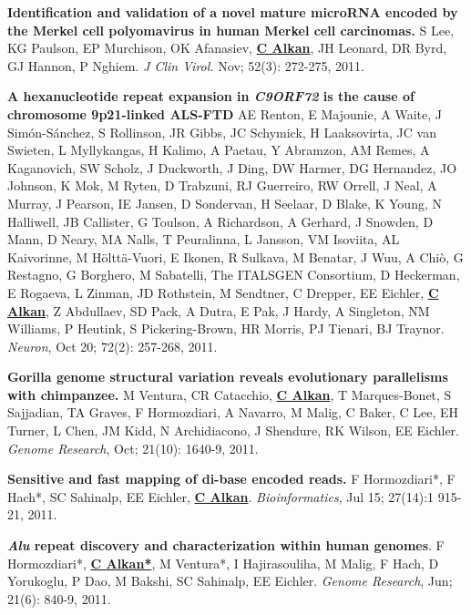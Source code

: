 \vspace{-.2cm}
{\bf Identification and validation of a novel mature microRNA encoded by the Merkel cell polyomavirus in human Merkel cell carcinomas.}
S Lee, KG Paulson, EP Murchison, OK Afanasiev, {\bf {\underline {C Alkan}}}, JH Leonard, DR Byrd, GJ Hannon, 
P Nghiem. {\em J Clin Virol.} Nov; 52(3): 272-275, 2011. 

\clearpage

\vspace{-.2cm}
{\bf A hexanucleotide repeat expansion in \textit{C9ORF72} is the cause of chromosome 9p21-linked ALS-FTD}  
AE Renton, E Majounie, A Waite, J Simón-Sánchez, S Rollinson, JR Gibbs, JC Schymick, H Laaksovirta, JC van Swieten, L Myllykangas, 
H Kalimo, A Paetau, Y Abramzon, AM Remes, A Kaganovich, SW Scholz, J Duckworth, J Ding, DW Harmer, DG Hernandez, JO Johnson, 
K Mok, M Ryten, D Trabzuni, RJ Guerreiro, RW Orrell, J Neal, A Murray, J Pearson, IE Jansen, D Sondervan, H Seelaar, D Blake, 
K Young, N Halliwell, JB Callister, G Toulson, A Richardson, A Gerhard, J Snowden, D Mann, D Neary, MA Nalls, T Peuralinna, 
L Jansson, VM Isoviita, AL Kaivorinne, M Hölttä-Vuori, E Ikonen, R Sulkava, M Benatar, J Wuu, A Chiò, G Restagno, 
G Borghero, M Sabatelli, The ITALSGEN Consortium, D Heckerman, E Rogaeva, L Zinman, JD Rothstein, M Sendtner, C Drepper, EE Eichler, 
{\bf {\underline {C Alkan}}}, Z Abdullaev, SD Pack, A Dutra, E Pak, J Hardy, A Singleton, NM Williams, P Heutink, S Pickering-Brown, 
HR Morris, PJ Tienari, BJ Traynor. {\em Neuron}, Oct 20; 72(2): 257-268, 2011.

\vspace{-.2cm}
{\bf Gorilla genome structural variation reveals evolutionary parallelisms with chimpanzee.}
M Ventura, CR Catacchio, {\bf {\underline {C Alkan}}}, T Marques-Bonet, S Sajjadian, TA Graves, F Hormozdiari, A Navarro, 
M Malig, C Baker, C Lee, EH Turner, L Chen, JM Kidd, N Archidiacono, J Shendure, RK Wilson, EE Eichler.
{\em Genome Research}, Oct; 21(10): 1640-9, 2011.


\vspace{-.2cm}
{\bf Sensitive and fast mapping of di-base encoded reads.}
F Hormozdiari*, F Hach*, SC Sahinalp, EE Eichler, {\bf {\underline {C Alkan}}}.
{\em Bioinformatics}, Jul 15; 27(14):1 915-21, 2011.



\vspace{-.2cm}
{\bf \textit {Alu} repeat discovery and characterization within human genomes}.
F Hormozdiari*, {\bf {\underline {C Alkan*}}}, M Ventura*, I Hajirasouliha, M Malig, 
F Hach, D Yorukoglu, P Dao, M Bakshi, SC Sahinalp, EE Eichler.
{\em Genome Research}, Jun; 21(6): 840-9, 2011.


